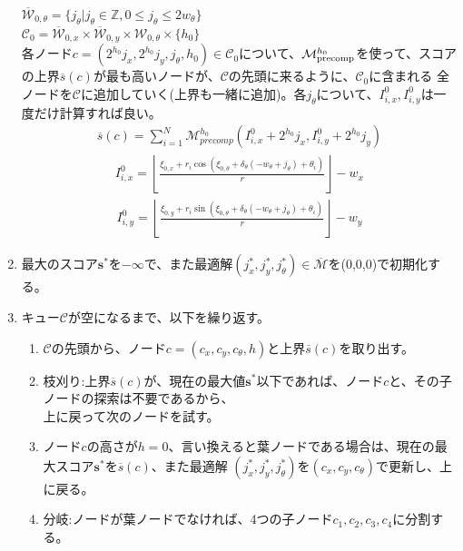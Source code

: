 \begin{enumerate}
  $\overline{\mathcal{W}}_{0,\theta}=\bigl\{j_{\theta}|j_{\theta}\in\mathbb{Z},0\leq j_{\theta}\leq 2w_{\theta}\bigr\}$\\
  $\mathcal{C}_0 = \overline{\mathcal{W}}_{0,x}\times\overline{\mathcal{W}}_{0,y}\times\mathcal{W}_{0,\theta}\times\{h_0\}$\\
  各ノード$c=(2^{h_0}j_x,2^{h_0}j_y,j_{\theta},h_0)\in\mathcal{C}_0$について、$\mathcal{M}^{h_0}_{\rm{precomp}}$を使って、スコアの上界$\overline{s}(c)$が最も高いノードが、$\mathcal{C}$の先頭に来るように、$\mathcal{C}_0$に含まれる
  全ノードを$\mathcal{C}$に追加していく(上界も一緒に追加)。各$j_{\theta}$について、$I_{i,x}^0,I_{i,y}^0$は一度だけ計算すれば良い。\\
  \begin{align*}
    \overline{s}(c)=\sum_{i = 1}^{N}\mathcal{M}^{h_0}_{precomp}(I_{i,x}^0+2^{h_0}j_x,I_{i,y}^{0}+2^{h_0}j_y)
  \end{align*}
  \begin{align*}
    I_{i,x}^0=\left\lfloor \frac{\xi_{0,x}+r_i\cos(\xi_{0,\theta}+\delta_{\theta}(-w_{\theta}+j_{\theta})+\theta_i)}{r} \right\rfloor - w_x
  \end{align*}
  \begin{align*}
    I_{i,y}^0=\left\lfloor \frac{\xi_{0,y}+r_i\sin(\xi_{0,\theta}+\delta_{\theta}(-w_{\theta}+j_{\theta})+\theta_i)}{r} \right\rfloor - w_y
  \end{align*}
  \item 最大のスコア$\bm{s}^{*}$を$-\infty$で、また最適解$(j_x^{*},j_y^{*},j_{\theta}^{*})\in\overline{\mathcal{M}}$を(0,0,0)で初期化する。
  \item キュー$\mathcal{C}$が空になるまで、以下を繰り返す。
  \begin{enumerate}
    \item $\mathcal{C}$の先頭から、ノード$c=(c_x,c_y,c_{\theta},h)$と上界$\overline{s}(c)$を取り出す。
    \item 枝刈り:上界$\overline{s}(c)$が、現在の最大値$\bm{s}^{*}$以下であれば、ノード$c$と、その子ノードの探索は不要であるから、\\
    上に戻って次のノードを試す。
    \item ノード$c$の高さが$h=0$、言い換えると葉ノードである場合は、現在の最大スコア$\bm{s}^*$を$\overline{s}(c)$、また最適解
    $(j_x^{*},j_y^{*},j_{\theta}^{*})$を$(c_x,c_y,c_{\theta})$で更新し、上に戻る。
    \item 分岐:ノードが葉ノードでなければ、4つの子ノード$c_1,c_2,c_3,c_4$に分割する。\\

\end{enumerate}
\end{enumerate}
